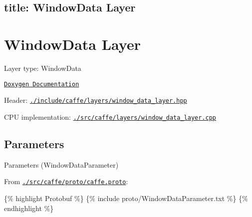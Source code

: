 

 \subsection*{title\+: Window\+Data Layer }

\section*{Window\+Data Layer}


\begin{DoxyItemize}
\item Layer type\+: {\ttfamily Window\+Data}
\item \href{http://caffe.berkeleyvision.org/doxygen/classcaffe_1_1WindowDataLayer.html}{\tt Doxygen Documentation}
\item Header\+: \href{https://github.com/BVLC/caffe/blob/master/include/caffe/layers/window_data_layer.hpp}{\tt {\ttfamily ./include/caffe/layers/window\+\_\+data\+\_\+layer.hpp}}
\item C\+PU implementation\+: \href{https://github.com/BVLC/caffe/blob/master/src/caffe/layers/window_data_layer.cpp}{\tt {\ttfamily ./src/caffe/layers/window\+\_\+data\+\_\+layer.cpp}}
\end{DoxyItemize}

\subsection*{Parameters}


\begin{DoxyItemize}
\item Parameters ({\ttfamily Window\+Data\+Parameter})
\item From \href{https://github.com/BVLC/caffe/blob/master/src/caffe/proto/caffe.proto}{\tt {\ttfamily ./src/caffe/proto/caffe.proto}}\+:
\end{DoxyItemize}

\{\% highlight Protobuf \%\} \{\% include proto/\+Window\+Data\+Parameter.\+txt \%\} \{\% endhighlight \%\} 
